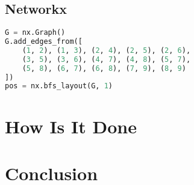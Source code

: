 \documentclass[11pt]{beamer}
\begin{document}
\subsection{Networkx}
\begin{frame}{\subsecname}
\begin{figure}
\resizebox{0.8\textwidth}{!}{}
\end{figure}
\end{frame}

\begin{frame}[fragile]{\subsecname}
    \begin{block}{}
        \begin{lstlisting}[language=python]
G = nx.Graph()
G.add_edges_from([
    (1, 2), (1, 3), (2, 4), (2, 5), (2, 6),
    (3, 5), (3, 6), (4, 7), (4, 8), (5, 7),
    (5, 8), (6, 7), (6, 8), (7, 9), (8, 9)
])
pos = nx.bfs_layout(G, 1)
        \end{lstlisting}
    \end{block}
\end{frame}

\section{How Is It Done}


\section{Conclusion}

\end{document}
